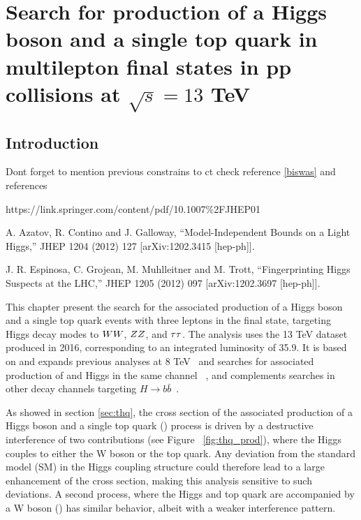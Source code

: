 \chapter{Search for production of a Higgs boson and a single top quark in multilepton final states in pp collisions at $\sqrt{s}=13$ TeV}\label{ch:analysis}

\section{Introduction}
\label{secc:Intro_analysis}


Dont forget to mention previous constrains to ct check reference \ref{biswas} and references

https://link.springer.com/content/pdf/10.1007\%2FJHEP01%

A. Azatov, R. Contino and J. Galloway, “Model-Independent Bounds on a Light Higgs,”
JHEP 1204 (2012) 127 [arXiv:1202.3415 [hep-ph]].

 J. R. Espinosa, C. Grojean, M. Muhlleitner and M. Trott, “Fingerprinting Higgs Suspects
 at the LHC,” JHEP 1205 (2012) 097 [arXiv:1202.3697 [hep-ph]].





















\noindent This chapter present the search for the associated production of a Higgs boson and a single top quark events with three leptons in the final state, targeting Higgs decay modes to $WW$, $ZZ$, and $\tau\tau$. The analysis uses the 13 TeV dataset produced in 2016, corresponding to an integrated luminosity of 35.9\fbinv. It is based on and expands previous analyses at 8 TeV~\cite{Khachatryan_2015,CMS_AN_2014-140} and searches for associated production of \ttbar and Higgs in the same channel ~\cite{CMS_AN_2016-211}, and complements searches in other decay channels targeting $H\to b\bar{b}$~\cite{CMS_PAS_HIG_16-019}.

\noindent As showed in section \ref{sec:thq}, the cross section of the associated production of a Higgs boson and a single top quark (\tHq) process is driven by a destructive interference of two contributions (see Figure ~\ref{fig:thq_prod}), where the Higgs couples to either the W boson or the top quark. Any deviation from the standard model (SM) in the Higgs coupling structure could therefore lead to a large enhancement of the cross section, making this analysis sensitive to such deviations. A second process, where the Higgs and top quark are accompanied by a W boson (\tHW) has similar behavior, albeit with a weaker interference pattern.

